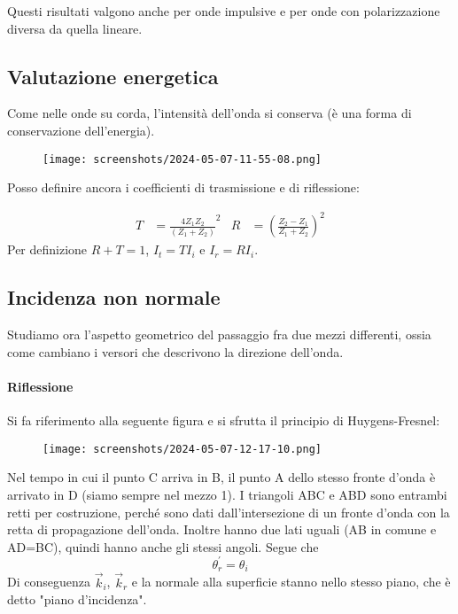 \begin{note}
	Questi risultati valgono anche per onde impulsive e per onde con polarizzazione diversa da quella lineare.
\end{note}

\subsection{Valutazione energetica}
Come nelle onde su corda, l'intensità dell'onda si conserva (è una forma di conservazione dell'energia).
\begin{figure}[H]
	\centering
	\texttt{[image: screenshots/2024-05-07-11-55-08.png]}
\end{figure}
Posso definire ancora i coefficienti di trasmissione e di riflessione:
\begin{definition}
	\begin{align}
		T &= \frac{4 Z_1 Z_2}{(Z_1 + Z_2)}^{2} &
		R &= \left( \frac{Z_2 - Z_1}{Z_1 + Z_2} \right)^{2}  
	\end{align}
	Per definizione \(R + T = 1\), \(I_t = T I_i\) e \(I_r = R I_i\).
\end{definition}

\subsection{Incidenza non normale}
Studiamo ora l'aspetto geometrico del passaggio fra due mezzi differenti, ossia come cambiano i versori che descrivono la direzione dell'onda.

\paragraph{Riflessione}
Si fa riferimento alla seguente figura e si sfrutta il principio di Huygens-Fresnel:
\begin{figure}[H]
	\centering
	\texttt{[image: screenshots/2024-05-07-12-17-10.png]}
\end{figure}
Nel tempo in cui il punto C arriva in B, il punto A dello stesso fronte d'onda è arrivato in D (siamo sempre nel mezzo 1). I triangoli ABC e ABD sono entrambi retti per costruzione, perché sono dati dall'intersezione di un fronte d'onda con la retta di propagazione dell'onda. Inoltre hanno due lati uguali (AB in comune e AD=BC), quindi hanno anche gli stessi angoli. Segue che
\begin{equation}
	\theta^{\prime} _r = \theta _i
\end{equation}
Di conseguenza \(\vec{k}_i\), \(\vec{k}_r\) e la normale alla superficie stanno nello stesso piano, che è detto "piano d'incidenza".

